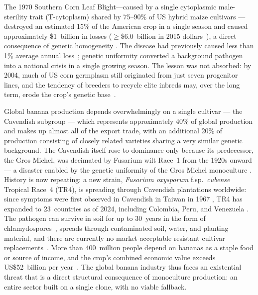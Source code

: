 The 1970 Southern Corn Leaf Blight---caused by a single cytoplasmic
male-sterility trait (T-cytoplasm) shared by 75--90\% of US hybrid maize cultivars \cite[pp.~108--109]{NRC1972}---destroyed an estimated 15\% of the American crop
in a single season and caused approximately \$1~billion in losses
\cite[p.~1113]{Tatum1971} ($\geq$\$6.0~billion in 2015
dollars~\cite[p.~1218]{Bruns2017}), a direct consequence of genetic
homogeneity \cite[p.~1113]{Tatum1971}. The disease had previously caused less
than 1\% average annual loss~\cite[p.~1115]{Tatum1971}; genetic uniformity
converted a background pathogen into a national crisis in a single growing
season. The lesson was not absorbed: by 2004, much of US corn germplasm still originated from just seven progenitor lines, and the tendency of breeders to recycle elite inbreds may, over the long term, erode the crop's genetic base~\cite[pp.~1193,~1203]{mikel2006evolution}.


Global banana production depends overwhelmingly on a single cultivar — the Cavendish subgroup — which represents approximately 40\% of global production and makes up almost all of the export trade, with an additional 20\% of production consisting of closely related varieties sharing a very similar genetic background. The Cavendish itself rose to dominance only because its predecessor, the Gros Michel, was decimated by Fusarium wilt Race~1 from the 1920s onward --- a disaster enabled by the genetic uniformity of the Gros Michel monoculture \cite[pp.~2147,~2149--2150]{kema2021vulnerability}. History is now repeating: a new strain, \textit{Fusarium oxysporum} f.sp.\ \textit{cubense} Tropical Race~4 (TR4), is spreading through Cavendish plantations worldwide: since symptoms were first observed in Cavendish in Taiwan in 1967 \cite[p.~2150]{kema2021vulnerability}, TR4 has expanded to 23~countries as of 2024, including Colombia, Peru, and Venezuela \cite[p.~1]{munhoz2024fusarium}. The pathogen can survive in soil for up to 30~years in the form of chlamydospores~\cite[p.~653]{ploetz2006fusarium}, spreads through contaminated soil, water, and planting material, and there are currently no market-acceptable resistant cultivar replacements~\cite[p.~761]{roberts2024diagnostics}. More than 400~million people depend on bananas as a staple food or source of income, and the crop's combined economic value exceeds US\$52~billion per year~\cite[pp.~2146,~2151]{kema2021vulnerability}. The global banana industry thus faces an existential threat that is a direct structural consequence of monoculture production: an entire sector built on a single clone, with no viable fallback.

